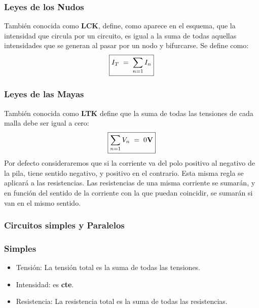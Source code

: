\subsubsection{Leyes de los Nudos}
\begin{wrapfigure}{r}{3cm}
\end{wrapfigure}
 También conocida como \textbf{LCK}, define, como aparece en el esquema, que la intensidad que circula por un circuito, es igual a la suma de todas aquellas intensidades que se generan al pasar por un nodo y bifurcarse. Se define como:
\[
        \boxed{I_T \hspace{1mm} = \hspace{1mm} \sum_{n=1}I_n}
\]
\subsubsection{Leyes de las Mayas}
 También conocida como \textbf{LTK} define que la suma de todas las tensiones de cada malla debe ser igual a cero:
\[
        \boxed{\sum_{n=1}V_n \hspace{1mm} = \hspace{1mm} 0\textnormal{\textbf{V}}}
\]
 Por defecto consideraremos que si la corriente va del polo positivo al negativo de la pila, tiene sentido negativo, y positivo en el contrario. Esta misma regla se aplicará a las resistencias.
Las resistencias de una misma corriente se sumarán, y en función del sentido de la corriente con la que puedan coincidir, se sumarán si van en el mismo sentido.
\subsubsection{Circuitos simples y Paralelos}
\subsubsection{Simples}
\begin{itemize}
        \item Tensión: La tensión total es la suma de todas las tensiones.
        \item Intensidad: es \textbf{cte}.
        \item Resistencia: La resistencia total es la suma de todas las resistencias.
\end{itemize}
